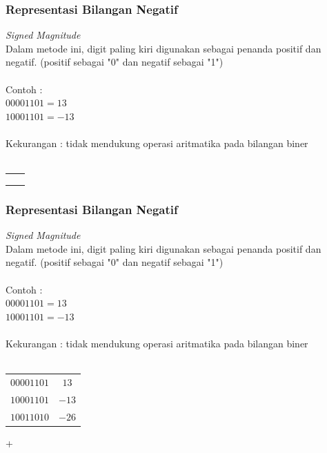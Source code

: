 \documentclass{beamer}
\begin{document}

\begin{frame}
\frametitle{Representasi Bilangan Negatif}
\textit{Signed Magnitude}
\\Dalam metode ini, digit paling kiri digunakan sebagai penanda positif dan negatif. (positif sebagai "0" dan negatif sebagai "1")
\\\ \\Contoh :
\\$00001101 = 13$
\\$10001101 = -13$
\\\ \\Kekurangan : tidak mendukung operasi aritmatika pada bilangan biner
\\\ \\\begin{tabular}{cc}
	&\\
	&\\
	&\\
\end{tabular} 


\end{frame}


\begin{frame}
\frametitle{Representasi Bilangan Negatif}
\textit{Signed Magnitude}
\\Dalam metode ini, digit paling kiri digunakan sebagai penanda positif dan negatif. (positif sebagai "0" dan negatif sebagai "1")
\\\ \\Contoh :
\\$00001101 = 13$
\\$10001101 = -13$
\\\ \\Kekurangan : tidak mendukung operasi aritmatika pada bilangan biner
\\\ \\\begin{tabular}{cc}
	$00001101$ & $13$\\
	$10001101$ & $-13$\\
	\hline
	$10011010$ & $-26$\\
\end{tabular} +


\end{frame}

\end{document}
